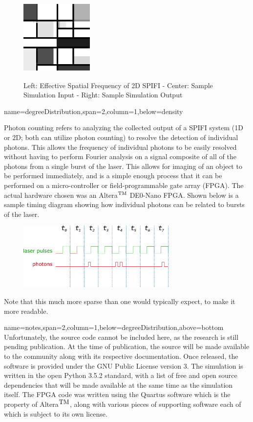 \documentclass[a0paper,portrait]{baposter}
\begin{document}
\begin{poster}
{\begin{figure}[H]
	\includegraphics[width=0.32\textwidth,height=12em]{pix/testoutput}
	\caption{Left: Effective Spatial Frequency of 2D SPIFI - Center: Sample Simulation Input - Right: Sample Simulation Output}
\end{figure}
}

{name=degreeDistribution,span=2,column=1,below=density}{
Photon counting refers to analyzing the collected output of a SPIFI system (1D or 2D; both can utilize photon counting) to resolve the detection of individual photons. This allows the frequency of individual photons to be easily resolved without having to perform Fourier analysis on a signal composite of all of the photons from a single burst of the laser. This allows for imaging of an object to be performed immediately, and is a simple enough process that it can be performed on a micro-controller or field-programmable gate array (FPGA). The actual hardware chosen was an Altera$^\textnormal{TM}$ DE0-Nano FPGA. Shown below is a sample timing diagram showing how individual photons can be related to bursts of the laser.\\
\begin{figure}[H]
	\centering
	\includegraphics[width=0.7\textwidth]{pix/sample-timing-diagram}
\end{figure}
Note that this much more sparse than one would typically expect, to make it more readable.
}

{name=notes,span=2,column=1,below=degreeDistribution,above=bottom}{
	Unfortunately, the source code cannot be included here, as the research is still pending publication. At the time of publication, the source will be made available to the community along with its respective documentation.
Once released, the software is provided under the GNU Public License version 3. The simulation is written in the open Python 3.5.2 standard, with a list of free and open source dependencies that will be made available at the same time as the simulation itself. The FPGA code was written using the Quartus software which is the property of Altera$^\textnormal{\small TM}$, along with various pieces of supporting software each of which is subject to its own license.
}

\end{poster}
\end{document}
